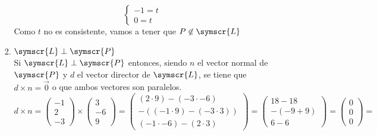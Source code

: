 \documentclass{article}
\def\fancyL{\symscr{L}}
\def\fancyP{\symscr{P}}
\begin{document}
\begin{enumerate}
\begin{itemize}
\begin{enumerate}
\[\begin{cases}
                                -1 = t \\
                                0 = t
                            \end{cases}
                        \]
                        Como \(t\) no es consistente, vamos a tener que \(P \not\in \fancyL\)
                    \item \(\fancyL \perp \fancyP\) \\
                        Si \(\fancyL \perp \fancyP\) entonces, siendo \(n\) el vector normal de \(\fancyP\) y \(d\) el vector director de \(\fancyL\),
                        se tiene que \(d \times n = \vec{0}\) o que ambos vectores son paralelos.
                        \[
                            d \times n = 
                            \begin{pmatrix}
                                -1 \\ 2 \\ -3
                            \end{pmatrix}
                            \times
                            \begin{pmatrix}
                                3 \\ -6 \\ 9
                            \end{pmatrix}
                            =
                            \begin{pmatrix}
                                (2 \cdot 9) - (-3 \cdot -6) \\
                                -( (-1 \cdot 9) - (-3 \cdot 3)) \\
                                (-1 \cdot -6) - (2 \cdot 3)
                            \end{pmatrix}
                            =
                            \begin{pmatrix}
                                18 - 18 \\
                                -(-9 + 9) \\
                                6 - 6
                            \end{pmatrix}
                            =
                            \begin{pmatrix}
                                0 \\ 0 \\ 0
                            \end{pmatrix}
                            =
\]
\end{enumerate}
\end{itemize}
\end{enumerate}
\end{document}
